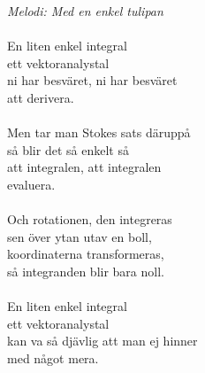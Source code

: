 {\footnotesize\textit{Melodi: Med en enkel tulipan}}\\
\\
En liten enkel integral\\
ett vektoranalystal\\
ni har besväret, ni har besväret\\
att derivera.\\
\\
Men tar man Stokes sats däruppå\\
så blir det så enkelt så\\
att integralen, att integralen\\
evaluera.\\
\\
Och rotationen, den integreras\\
sen över ytan utav en boll,\\
koordinaterna transformeras,\\
så integranden blir bara noll.\\
\\
En liten enkel integral\\
ett vektoranalystal\\
kan va så djävlig att man ej hinner\\
med något mera.

